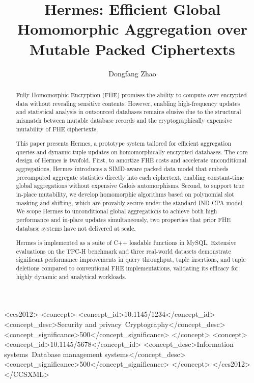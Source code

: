 \documentclass[sigconf,nonacm]{acmart}
\title{Hermes: Efficient Global Homomorphic Aggregation over Mutable Packed Ciphertexts}
\author{Dongfang Zhao}
\affiliation{
  \institution{Tacoma School of Engineering and Technology}
  \institution{Paul G. Allen School of Computer Science \& Engineering}
  \city{University of Washington}
  \country{}
}
\begin{document}
\begin{abstract}
Fully Homomorphic Encryption (FHE) promises the ability to compute over encrypted data without revealing sensitive contents. However, enabling high-frequency updates and statistical analysis in outsourced databases remains elusive due to the structural mismatch between mutable database records and the cryptographically expensive mutability of FHE ciphertexts.

This paper presents Hermes, a prototype system tailored for efficient aggregation queries and dynamic tuple updates on homomorphically encrypted databases. The core design of Hermes is twofold. First, to amortize FHE costs and accelerate unconditional aggregations, Hermes introduces a SIMD-aware packed data model that embeds precomputed aggregate statistics directly into each ciphertext, enabling constant-time global aggregations without expensive Galois automorphisms. Second, to support true in-place mutability, we develop homomorphic algorithms based on polynomial slot masking and shifting, which are provably secure under the standard IND-CPA model. We scope Hermes to unconditional global aggregations to achieve both high performance and in-place updates simultaneously, two properties that prior FHE database systems have not delivered at scale.

Hermes is implemented as a suite of C++ loadable functions in MySQL. Extensive evaluations on the TPC-H benchmark and three real-world datasets demonstrate significant performance improvements in query throughput, tuple insertions, and tuple deletions compared to conventional FHE implementations, validating its efficacy for highly dynamic and analytical workloads.
\end{abstract}


\begin{CCSXML}
<ccs2012>
  <concept>
    <concept_id>10.1145/1234</concept_id>
    <concept_desc>Security and privacy~Cryptography</concept_desc>
    <concept_significance>500</concept_significance>
  </concept>
  <concept>
    <concept_id>10.1145/5678</concept_id>
    <concept_desc>Information systems~Database management systems</concept_desc>
    <concept_significance>500</concept_significance>
  </concept>
</ccs2012>
</CCSXML>
\end{CCSXML}

\end{document}
